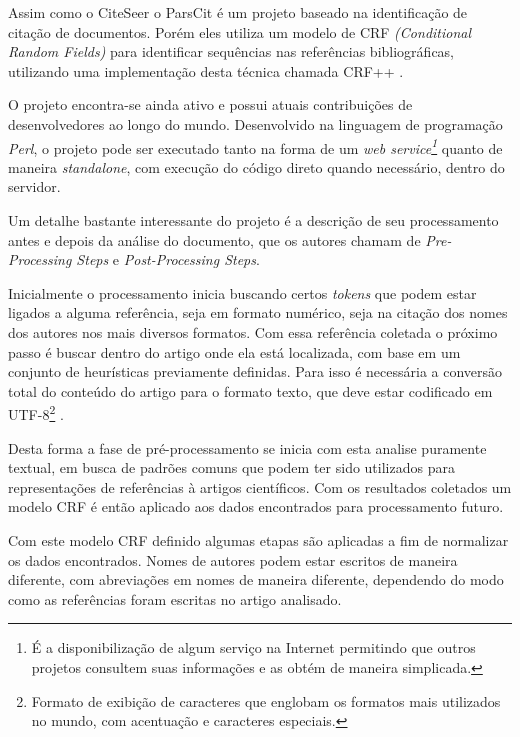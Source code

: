 \begin{textedited}
Assim como o CiteSeer o ParsCit é um projeto baseado na identificação de citação de documentos. Porém eles utiliza um modelo de CRF \textit{(Conditional Random Fields)} para identificar sequências nas referências bibliográficas, utilizando uma implementação desta técnica chamada CRF++ \cite{Councill-Giles-2008-ParsCit}.
\end{textedited}

O projeto encontra-se ainda ativo e possui atuais contribuições de desenvolvedores ao longo do mundo. Desenvolvido na linguagem de programação \textit{Perl}, o projeto pode ser executado tanto na forma de um \textit{web service\footnote{É a disponibilização de algum serviço na Internet permitindo que outros projetos consultem suas informações e as obtém de maneira simplicada.}} quanto de maneira \textit{standalone}, com execução do código direto quando necessário, dentro do servidor.

Um detalhe bastante interessante do projeto é a descrição de seu processamento antes e depois da análise do documento, que os autores chamam de \textit{Pre-Processing Steps} e \textit{Post-Processing Steps}.

Inicialmente o processamento inicia buscando certos \textit{tokens} que podem estar ligados a alguma referência, seja em formato numérico, seja na citação dos nomes dos autores nos mais diversos formatos. Com essa referência coletada o próximo passo é buscar dentro do artigo onde ela está localizada, com base em um conjunto de heurísticas previamente definidas. Para isso é necessária a conversão total do conteúdo do artigo para o formato texto, que deve estar codificado em UTF-8\footnote{Formato de exibição de caracteres que englobam os formatos mais utilizados no mundo, com acentuação e caracteres especiais.} \cite{Councill-Giles-2008-ParsCit}.

Desta forma a fase de pré-processamento se inicia com esta analise puramente textual, em busca de padrões comuns que podem ter sido utilizados para representações de referências à artigos científicos. Com os resultados coletados um modelo CRF é então aplicado aos dados encontrados para processamento futuro.

Com este modelo CRF definido algumas etapas são aplicadas a fim de normalizar os dados encontrados. Nomes de autores podem estar escritos de maneira diferente, com abreviações em nomes de maneira diferente, dependendo do modo como as referências foram escritas no artigo analisado.


